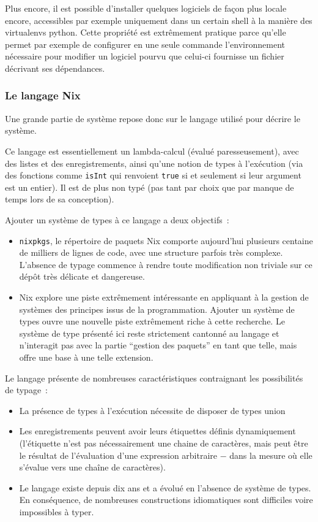 \begin{description}
    Plus encore, il est possible d'installer quelques logiciels de façon plus
    locale encore, accessibles par exemple uniquement dans un certain shell à
    la manière des virtualenvs python. Cette propriété est extrêmement pratique
    parce qu'elle permet par exemple de configurer en une seule commande
    l'environnement nécessaire pour modifier un logiciel pourvu que celui-ci
    fournisse un fichier décrivant ses dépendances.
\end{description}

\subsubsection{Le langage Nix}

Une grande partie de système repose donc sur le langage utilisé pour décrire le
système.

Ce langage est essentiellement un lambda-calcul (évalué paresseusement), avec
des listes et des enregistrements, ainsi qu'une notion de types à l'exécution
(via des fonctions comme \lstinline{isInt} qui renvoient \lstinline{true} si et
seulement si leur argument est un entier).
Il est de plus non typé (pas tant par choix que par manque de temps lors de sa
conception).

Ajouter un système de types à ce langage a deux objectifs :

\begin{itemize}
  \item \texttt{nixpkgs}, le répertoire de paquets Nix comporte aujourd'hui
    plusieurs centaine de milliers de lignes de code, avec une structure
    parfois très complexe.
    L'absence de typage commence à rendre toute modification non triviale sur
    ce dépôt très délicate et dangereuse.
  \item Nix explore une piste extrêmement intéressante en appliquant à la
    gestion de systèmes des principes issus de la programmation. Ajouter un
    système de types ouvre une nouvelle piste extrêmement riche à cette
    recherche. Le système de type présenté ici reste strictement cantonné au
    langage et n'interagit pas avec la partie ``gestion des paquets'' en tant que
    telle, mais offre une base à une telle extension.
\end{itemize}

Le langage présente de nombreuses caractéristiques contraignant les
possibilités de typage :

\begin{itemize}
  \item La présence de types à l'exécution nécessite de disposer de types union
  \item Les enregistrements peuvent avoir leurs étiquettes définis
    dynamiquement (l'étiquette n'est pas nécessairement une chaine de
    caractères, mais peut être le résultat de l'évaluation d'une expression
    arbitraire − dans la mesure où elle s'évalue vers une chaîne de
    caractères).
  \item Le langage existe depuis dix ans et a évolué en l'absence de système de
    types. En conséquence, de nombreuses constructions idiomatiques sont
    difficiles voire impossibles à typer.
\end{itemize}
